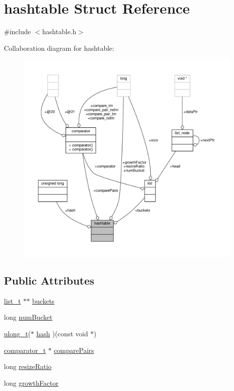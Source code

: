 \hypertarget{structhashtable}{\section{hashtable Struct Reference}
\label{structhashtable}
}


{\ttfamily \#include $<$hashtable.\-h$>$}



Collaboration diagram for hashtable\-:
\nopagebreak
\begin{figure}[H]
\begin{center}
\leavevmode
\includegraphics[width=350pt]{structhashtable__coll__graph}
\end{center}
\end{figure}
\subsection*{Public Attributes}
\begin{DoxyCompactItemize}
\item 
\hyperlink{list_8h_af629e6a6713d7de11eab50cbe6449b06}{list\-\_\-t} $\ast$$\ast$ \hyperlink{structhashtable_a1adbcc414b295815bfa5c9d0785ceded}{buckets}
\item 
long \hyperlink{structhashtable_acaec0de05e91bb1e9d4f8350f6e0564c}{num\-Bucket}
\item 
\hyperlink{types_8h_a95c0f4cc152cbacf72a7d70d7077dc96}{ulong\-\_\-t}($\ast$ \hyperlink{structhashtable_a5d157f331daf555aeedd9e9b3b7e1bd1}{hash} )(const void $\ast$)
\item 
\hyperlink{lehigh_8h_a493abab632f5cea71ed0baaef40590aa}{comparator\-\_\-t} $\ast$ \hyperlink{structhashtable_aab34ba0f89c3fb5600150496be66743e}{compare\-Pairs}
\item 
long \hyperlink{structhashtable_a5641b7e26e1b1fdf4a1a34c82ce87916}{resize\-Ratio}
\item 
long \hyperlink{structhashtable_ae2c4a39d662cc18a7763ebcf3f0e2495}{growth\-Factor}
\end{DoxyCompactItemize}


